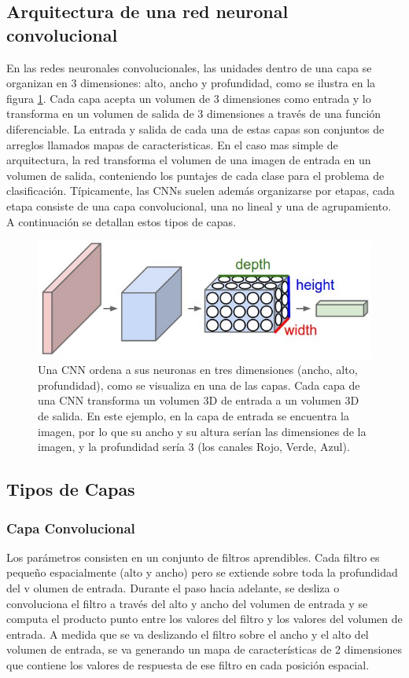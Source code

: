 \documentclass[a4paper,11pt,spanish]{book}
\begin{document}
    \subsection {Arquitectura de una red neuronal convolucional}
      En las redes neuronales convolucionales, las unidades dentro de una capa se organizan en 3 dimensiones: alto, ancho y profundidad, como se ilustra en la figura \ref{fig:cnn}.
      Cada capa acepta un volumen de 3 dimensiones como entrada y lo transforma en un volumen de salida de 3 dimensiones a través de una función diferenciable.
      La entrada y salida de cada una de estas capas son conjuntos de arreglos llamados mapas de caracteristicas.
      En el caso mas simple de arquitectura, la red transforma el volumen de una imagen de entrada en un volumen de salida, conteniendo los puntajes de cada clase para el problema de clasificación.
      Típicamente, las CNNs suelen además organizarse por etapas, cada etapa consiste de una capa convolucional, una no lineal y una de agrupamiento.
      A continuación se detallan estos tipos de capas.
      \begin{figure}[H]
	\begin{center}
	\includegraphics[width=0.8\linewidth]{./img/stanford_cnn.jpeg}
	\end{center}
	\caption{Una CNN ordena a sus neuronas en tres dimensiones (ancho, alto, profundidad), como se visualiza en una de
	  las capas. Cada capa de una CNN transforma un volumen 3D de entrada a un volumen 3D de salida. En este ejemplo, en la capa de entrada se encuentra la imagen, por lo que su ancho y su altura
	  serían las dimensiones de la imagen, y la profundidad sería 3 (los canales Rojo, Verde, Azul). \cite{Karpathy:Stanford}}
	\label{fig:cnn}
      \end{figure}
\fi

    \subsection {Tipos de Capas}
      \subsubsection{Capa Convolucional} \label{}
	Los parámetros consisten en un conjunto de filtros aprendibles. Cada filtro es pequeño espacialmente (alto y ancho) pero se extiende sobre toda la profundidad del v
	olumen de entrada.
	Durante el paso hacia adelante, se desliza o convoluciona el filtro a través del alto y ancho del volumen de entrada y se computa el producto punto entre los valores del filtro y los valores
	del volumen de entrada. 
	A medida que se va deslizando el filtro sobre el ancho y el alto del volumen de entrada, se va generando un mapa de características de 2 dimensiones que contiene 
	los valores de respuesta de ese filtro en cada posición espacial.
\end{document}
